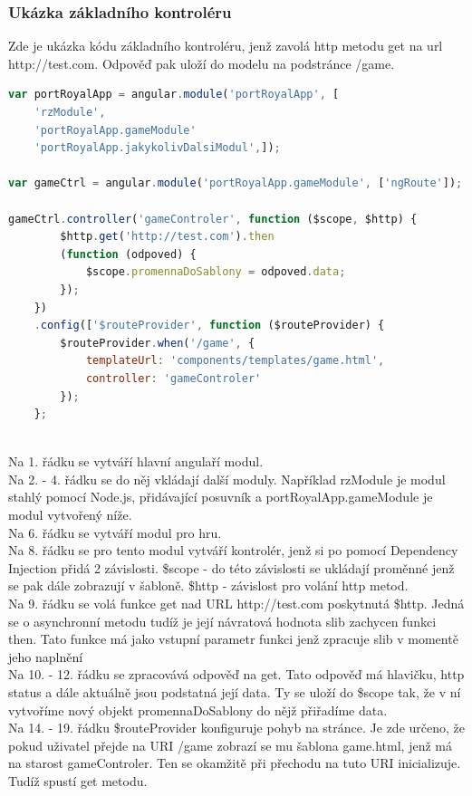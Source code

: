 \documentclass[czech,master,public,dept460,male,cpdeclaration,twoside]{diploma}
\begin{document}
\subsubsection{Ukázka základního kontroléru}
Zde je ukázka kódu základního kontroléru, jenž zavolá http metodu get na url http://test.com. Odpověď pak uloží do modelu na podstránce /game.
\begin{lstlisting}[language=JavaScript, caption=Ukázka kontroléru v AngularJS]
var portRoyalApp = angular.module('portRoyalApp', [
    'rzModule',
    'portRoyalApp.gameModule'
    'portRoyalApp.jakykolivDalsiModul',]);

var gameCtrl = angular.module('portRoyalApp.gameModule', ['ngRoute']);

gameCtrl.controller('gameControler', function ($scope, $http) {
        $http.get('http://test.com').then
        (function (odpoved) {
            $scope.promennaDoSablony = odpoved.data;
        });
    })
    .config(['$routeProvider', function ($routeProvider) {
        $routeProvider.when('/game', {
            templateUrl: 'components/templates/game.html',
            controller: 'gameControler'
        });
    };
\end{lstlisting}
~\\
Na 1. řádku se vytváří hlavní angulaří modul.\\
Na 2. - 4. řádku  se do něj vkládají další moduly. Například rzModule je modul stahlý pomocí Node.js, přidávající posuvník a portRoyalApp.gameModule je modul vytvořený níže.\\
Na 6. řádku se vytváří modul pro hru.\\
Na 8. řádku se pro tento modul vytváří kontrolér, jenž si po pomocí Dependency Injection přidá 2 závislosti. \$scope - do této závislosti se ukládají proměnné jenž se pak dále zobrazují v šabloně. \$http - závislost pro volání http metod.\\
Na 9. řádku se volá funkce get nad URL http://test.com poskytnutá \$http. Jedná se o asynchronní metodu tudíž je její návratová hodnota slib zachycen funkci then. Tato funkce má jako vstupní parametr funkci jenž zpracuje slib v momentě jeho naplnění\\
Na 10. - 12. řádku se zpracovává odpověď na get. Tato odpověď má hlavičku, http status a dále aktuálně jsou podstatná její data. Ty se uloží do \$scope tak, že v ní vytvoříme nový objekt promennaDoSablony do nějž přiřadíme data.\\
Na 14. - 19.  řádku \$routeProvider konfiguruje pohyb na stránce. Je zde určeno, že pokud uživatel přejde na URI /game zobrazí se mu šablona game.html, jenž má na starost gameControler. Ten se okamžitě při přechodu na tuto URI inicializuje. Tudíž spustí get metodu.
\end{document}
